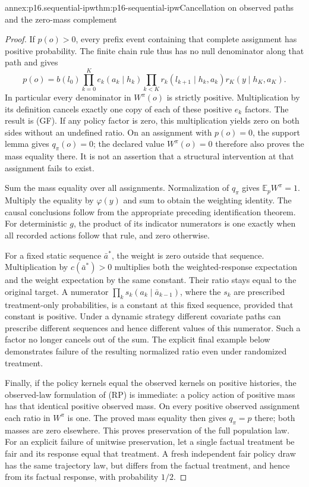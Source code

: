\begin{annexitem}{annex:p16.sequential-ipw}{thm:p16-sequential-ipw}{Cancellation on observed paths and the zero-mass complement}
\begin{proof}
If \(p(o)>0\), every prefix event containing that complete assignment
has positive probability. The finite chain rule thus has no null
denominator along that path and gives
\[
 p(o)=b(l_0)\prod_{k=0}^K e_k(a_k\mid h_k)
               \prod_{k<K}r_k(l_{k+1}\mid h_k,a_k)r_K(y\mid h_K,a_K).
\]
In particular every denominator in \(W^\pi(o)\) is strictly positive.
Multiplication by its definition cancels exactly one copy of each of
these positive \(e_k\) factors. The result is (GF). If any policy
factor is zero, this multiplication yields zero on both sides without
an undefined ratio. On an assignment with \(p(o)=0\), the support lemma
gives \(q_\pi(o)=0\); the declared value \(W^\pi(o)=0\) therefore
also proves the mass equality there. It is not an assertion that a
structural intervention at that assignment fails to exist.

Sum the mass equality over all assignments. Normalization of \(q_\pi\)
gives \(\mathbb E_pW^\pi=1\). Multiply the equality by \(\varphi(y)\)
and sum to obtain the weighting identity. The causal conclusions follow
from the appropriate preceding identification theorem. For deterministic
\(g\), the product of its indicator numerators is one exactly when all
recorded actions follow that rule, and zero otherwise.

For a fixed static sequence \(\bar a^*\), the weight is zero outside
that sequence. Multiplication by \(c(\bar a^*)>0\) multiplies both the
weighted-response expectation and the weight expectation by the same
constant. Their ratio stays equal to the original target. A numerator
\(\prod_k s_k(a_k\mid\bar a_{k-1})\), where the \(s_k\) are prescribed
treatment-only probabilities, is a constant at this fixed sequence,
provided that constant is positive. Under a dynamic strategy different
covariate paths can prescribe different sequences and hence different
values of this numerator. Such a factor no longer cancels out of the
sum. The explicit final example below demonstrates failure of the
resulting normalized ratio even under randomized treatment.

Finally, if the policy kernels equal the observed kernels on positive
histories, the observed-law formulation of (RP) is immediate: a policy
action of positive mass has that identical positive observed mass.
On every positive observed assignment each ratio in \(W^\pi\) is one.
The proved mass equality then gives \(q_\pi=p\) there; both masses are
zero elsewhere. This proves preservation of the full population law.
For an explicit failure of unitwise preservation, let a single factual
treatment be fair and its response equal that treatment. A fresh independent
fair policy draw has the same trajectory law, but differs from the factual
treatment, and hence from its factual response, with probability \(1/2\).
\end{proof}
\end{annexitem}

